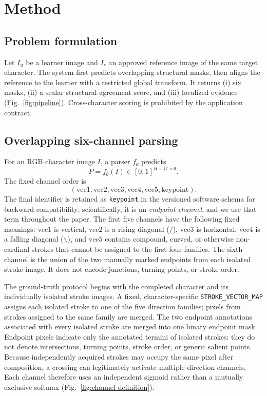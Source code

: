 \section{Method}
\label{sec:method}

\subsection{Problem formulation}

Let \(I_u\) be a learner image and \(I_r\) an approved reference image of the
same target character. The system first predicts overlapping structural masks,
then aligns the reference to the learner with a restricted global transform.
It returns (i) six masks, (ii) a scalar structural-agreement score, and
(iii) localized evidence (Fig.~\ref{fig:pipeline}). Cross-character
scoring is prohibited by the application contract.

\subsection{Overlapping six-channel parsing}

For an RGB character image \(I\), a parser \(f_\theta\) predicts
\[
P=f_\theta(I)\in[0,1]^{H\times W\times 6}.
\]
The fixed channel order is
\[
(\mathrm{vec1},\mathrm{vec2},\mathrm{vec3},\mathrm{vec4},
\mathrm{vec5},\mathrm{keypoint}).
\]
The final identifier is retained as \texttt{keypoint} in the versioned
software schema for backward compatibility; scientifically, it is an
\emph{endpoint channel}, and we use that term throughout the paper.
The first five channels have the following fixed meanings:
\(\mathrm{vec1}\) is vertical, \(\mathrm{vec2}\) is a rising diagonal
(\(/\)), \(\mathrm{vec3}\) is horizontal, \(\mathrm{vec4}\) is a falling
diagonal (\(\backslash\)), and \(\mathrm{vec5}\) contains compound, curved,
or otherwise non-cardinal strokes that cannot be assigned to the first four
families. The sixth channel is the union of the two manually marked endpoints
from each isolated stroke image. It does not encode junctions, turning points,
or stroke order.

The ground-truth protocol begins with the completed character and its
individually isolated stroke images. A fixed, character-specific
\texttt{STROKE\_VECTOR\_MAP} assigns each isolated stroke to one of the five
direction families; pixels from strokes assigned to the same family are
merged. The two endpoint annotations associated with every isolated stroke
are merged into one binary endpoint mask. Endpoint pixels indicate only the
annotated termini of isolated strokes: they do not denote intersections,
turning points, stroke order, or generic salient points. Because independently
acquired strokes may occupy the same pixel after composition, a crossing can
legitimately activate multiple direction channels. Each channel therefore
uses an independent sigmoid rather than a mutually exclusive softmax
(Fig.~\ref{fig:channel-definition}).

